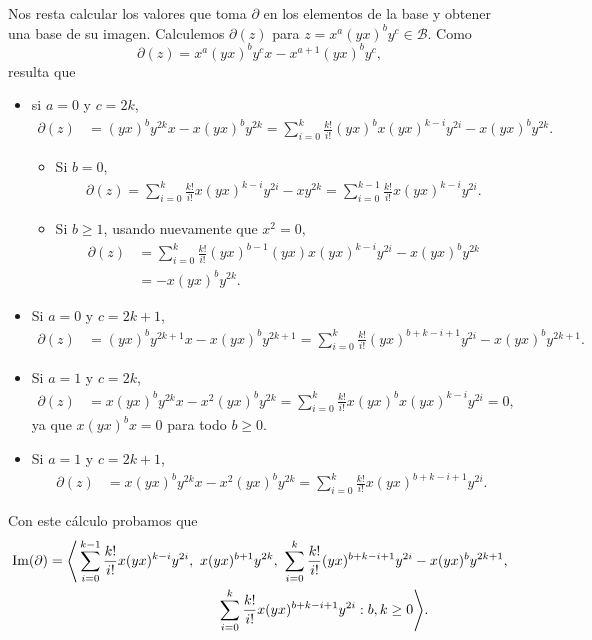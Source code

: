 \documentclass[fleqn,../tesis.tex]{subfiles}
\begin{document}
Nos resta calcular los valores que toma $\partial$ en los elementos de la base y obtener una base de su imagen.
Calculemos $\partial(z)$ para $z = x^a(yx)^by^c \in \mathcal{B}$. Como \[\partial(z) = x^a(yx)^by^cx - x^{a + 1}(yx)^by^c,\] resulta que
\begin{itemize}
\item si $a = 0$ y $c = 2k$,
	\begin{align*}
		\partial(z) &= (yx)^by^{2k}x - x(yx)^by^{2k} = \sum_{i = 0}^k\frac{k!}{i!}(yx)^bx(yx)^{k - i}y^{2i} - x(yx)^by^{2k}.
	\end{align*}
	\begin{itemize}
	\item Si $b = 0$,
		\begin{align*}
			\partial(z) = \sum_{i = 0}^k\frac{k!}{i!}x(yx)^{k - i}y^{2i} - xy^{2k} = \sum_{i = 0}^{k - 1}\frac{k!}{i!}x(yx)^{k - i}y^{2i}.
		\end{align*}
	\item Si $b \geq 1$, usando nuevamente que $x^2 = 0,$
		\begin{align*}
			\partial(z) &= \sum_{i = 0}^k\frac{k!}{i!}(yx)^{b-1}(yx)x(yx)^{k - i}y^{2i} - x(yx)^by^{2k} \\
			&=  -x(yx)^by^{2k}.
		\end{align*}
	\end{itemize}
\item Si $a = 0$ y $c = 2k + 1$,
	\begin{align*}
		\partial(z) &= (yx)^by^{2k + 1}x - x(yx)^by^{2k + 1}
			= \sum_{i = 0}^k\frac{k!}{i!}(yx)^{b + k - i + 1}y^{2i} - x(yx)^by^{2k + 1}.
	\end{align*}
\item Si $a = 1$ y  $c = 2k$,
	\begin{align*}
		\partial(z) &= x(yx)^by^{2k}x - x^2(yx)^by^{2k} 
			= \sum_{i = 0}^k\frac{k!}{i!}x(yx)^bx(yx)^{k - i}y^{2i} = 0,
	\end{align*}
ya que 	$x(yx)^bx = 0$ para todo $b \geq 0$.
\item Si $a = 1$ y  $c = 2k + 1$,
	\begin{align*}
		\partial(z) &= x(yx)^by^{2k}x - x^2(yx)^by^{2k} = \sum_{i = 0}^k\frac{k!}{i!}x(yx)^{b + k - i + 1}y^{2i}.
	\end{align*}
\end{itemize}
Con este cálculo probamos que
\begin{align*}
	\Ima(\partial) = \Bigg\langle & \sum_{i = 0}^{k - 1}\frac{k!}{i!}x(yx)^{k - i}y^{2i},
		\ x(yx)^{b + 1}y^{2k},
		\ \sum_{i = 0}^k\frac{k!}{i!}(yx)^{b + k - i + 1}y^{2i} - x(yx)^by^{2k + 1}, \\
		&\hspace{100pt}\sum_{i = 0}^k\frac{k!}{i!}x(yx)^{b + k - i + 1}y^{2i} : b,k \geq 0 \Bigg\rangle.
\end{align*}
\end{document}

